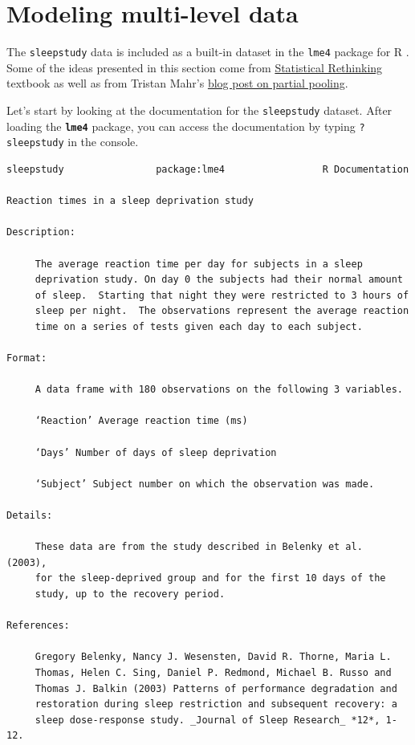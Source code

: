 \documentclass[]{book}
\begin{document}
\hypertarget{modeling-multi-level-data}{%
\section{Modeling multi-level data}\label{modeling-multi-level-data}}

The \texttt{sleepstudy} data is included as a built-in dataset in the \texttt{lme4} package for R \citep{Bates_et_al_2015}. Some of the ideas presented in this section come from \citet{McElreath_2020} \href{https://xcelab.net/rm/statistical-rethinking/}{Statistical Rethinking} textbook as well as from Tristan Mahr's \href{https://www.tjmahr.com/plotting-partial-pooling-in-mixed-effects-models/}{blog post on partial pooling}.

Let's start by looking at the documentation for the \texttt{sleepstudy} dataset. After loading the \textbf{\texttt{lme4}} package, you can access the documentation by typing \texttt{?sleepstudy} in the console.

\begin{verbatim}
sleepstudy                package:lme4                 R Documentation

Reaction times in a sleep deprivation study

Description:

     The average reaction time per day for subjects in a sleep
     deprivation study. On day 0 the subjects had their normal amount
     of sleep.  Starting that night they were restricted to 3 hours of
     sleep per night.  The observations represent the average reaction
     time on a series of tests given each day to each subject.

Format:

     A data frame with 180 observations on the following 3 variables.

     ‘Reaction’ Average reaction time (ms)

     ‘Days’ Number of days of sleep deprivation

     ‘Subject’ Subject number on which the observation was made.

Details:

     These data are from the study described in Belenky et al.  (2003),
     for the sleep-deprived group and for the first 10 days of the
     study, up to the recovery period.

References:

     Gregory Belenky, Nancy J. Wesensten, David R. Thorne, Maria L.
     Thomas, Helen C. Sing, Daniel P. Redmond, Michael B. Russo and
     Thomas J. Balkin (2003) Patterns of performance degradation and
     restoration during sleep restriction and subsequent recovery: a
     sleep dose-response study. _Journal of Sleep Research_ *12*, 1-12.
\end{verbatim}
\end{document}
